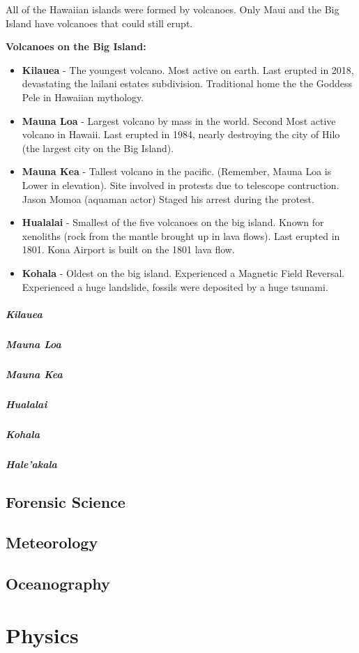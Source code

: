 \documentclass[12pt]{book}
\begin{document}
				All of the Hawaiian islands were formed by volcanoes.  Only Maui and the Big Island have volcanoes that could still erupt.  
				
				\vspace{0.1in}
			
				\textbf{Volcanoes on the Big Island:}
				\begin{itemize}
					\item \textbf{Kilauea} - The youngest volcano.  Most active on earth.  Last erupted in 2018, devastating the lailani estates subdivision.  Traditional home the the Goddess Pele in Hawaiian mythology.  
					\item \textbf{Mauna Loa} - Largest volcano by mass in the world.  Second Most active volcano in Hawaii.  Last erupted in 1984, nearly destroying the city of Hilo (the largest city on the Big Island).  
					\item \textbf{Mauna Kea} - Tallest volcano in the pacific. (Remember, Mauna Loa is Lower in elevation).  Site involved in protests due to telescope contruction.  Jason Momoa (aquaman actor) Staged his arrest during the protest. 
					\item \textbf{Hualalai} - Smallest of the five volcanoes on the big island.  Known for xenoliths (rock from the mantle brought up in lava flows).  Last erupted in 1801.  Kona Airport is built on the 1801 lava flow.  
					\item \textbf{Kohala} - Oldest on the big island.  Experienced a Magnetic Field Reversal.  Experienced a huge landslide, fossils were deposited by a huge tsunami.  
				\end{itemize}
				
				\subparagraph{Kilauea}
				\subparagraph{Mauna Loa}
				\subparagraph{Mauna Kea}
				\subparagraph{Hualalai}
				\subparagraph{Kohala}
				\subparagraph{Hale'akala}
		\subsection{Forensic Science}	
		\subsection{Meteorology}
		\subsection{Oceanography}
	\section{Physics}
\end{document}
